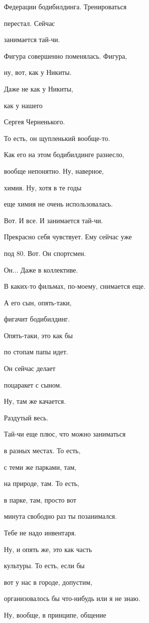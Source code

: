 Федерации бодибилдинга. Тренироваться

перестал. Сейчас

занимается тай-чи.

Фигура совершенно поменялась. Фигура,

ну, вот, как у Никиты.

Даже не как у Никиты,

как у нашего

Сергея Черненького.

То есть, он щупленький вообще-то.

Как его на этом бодибилдинге разнесло,

вообще непонятно. Ну, наверное,

химия. Ну, хотя в те годы

еще химия не очень использовалась.

Вот. И все. И занимается тай-чи.

Прекрасно себя чувствует. Ему сейчас уже

под 80. Вот. Он спортсмен.

Он... Даже в коллективе.

В каких-то фильмах, по-моему, снимается еще.

А его сын, опять-таки,

фигачит бодибилдинг.

Опять-таки, это как бы

по стопам папы идет.

Он сейчас делает

поцаракет с сыном.

Ну, там же качается.

Раздутый весь.

Тай-чи еще плюс, что можно заниматься

в разных местах. То есть,

с теми же парками, там,

на природе, там. То есть,

в парке, там, просто вот

минута свободно раз ты позанимался.

Тебе не надо инвентаря.

Ну, и опять же, это как часть

культуры. То есть, если бы

вот у нас в городе, допустим,

организовалось бы что-нибудь или я не знаю.

Ну, вообще, в принципе, общение

